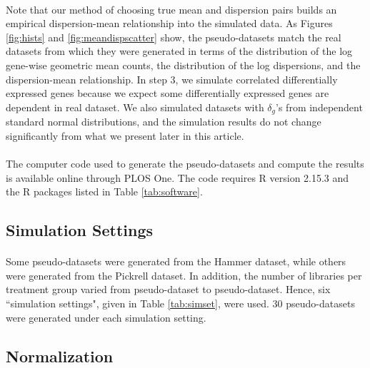\documentclass[10pt]{article}
\begin{document}
\paragraph{} \indent Note that our method of choosing true mean and dispersion pairs builds an empirical dispersion-mean relationship into the simulated data. As Figures \ref{fig:hists} and \ref{fig:meandispscatter} show, the pseudo-datasets match the real datasets from which they were generated in terms of the distribution of the log gene-wise geometric mean counts, the distribution of the log dispersions, and the dispersion-mean relationship. In step 3, we simulate correlated differentially expressed genes because we expect some differentially expressed genes are dependent in real dataset. We also simulated datasets with $\delta_g$'s from independent standard normal distributions, and the simulation results do not change significantly from what we present later in this article.

\paragraph{} \indent The computer code used to generate the pseudo-datasets and compute the results is available online through PLOS One. The code requires R version 2.15.3 and the R packages listed in Table \ref{tab:software}.

\subsection*{Simulation Settings}

\paragraph{} \indent Some pseudo-datasets were generated from the Hammer dataset, while others were generated from the Pickrell dataset. In addition, the number of libraries per treatment group varied from pseudo-dataset to pseudo-dataset. Hence, six ``simulation settings", given in Table \ref{tab:simset}, were used. 30 pseudo-datasets were generated under each simulation setting.

\subsection*{Normalization}
\end{document}
